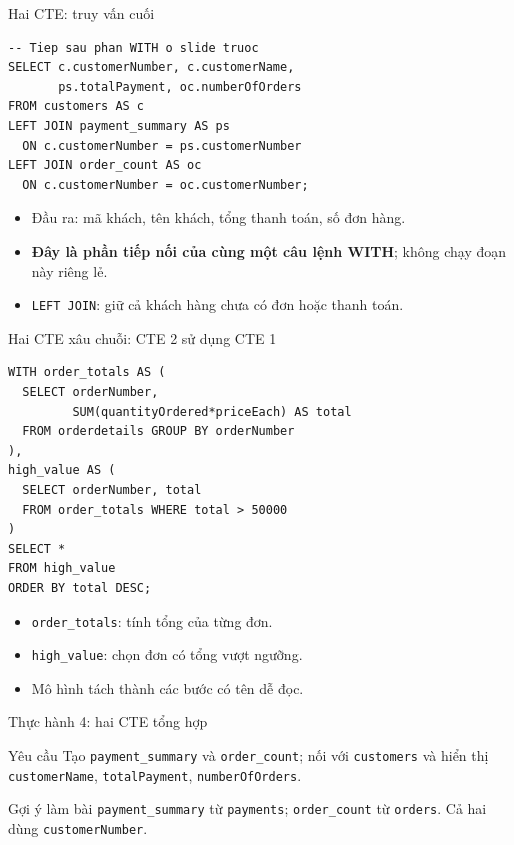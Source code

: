 \documentclass[aspectratio=169,10pt]{beamer}
\newcommand{\code}[1]{\texttt{#1}}
\begin{document}
\begin{frame}[fragile]{Hai CTE: truy vấn cuối}
\small
\begin{lstlisting}[basicstyle=\ttfamily\scriptsize]
-- Tiep sau phan WITH o slide truoc
SELECT c.customerNumber, c.customerName,
       ps.totalPayment, oc.numberOfOrders
FROM customers AS c
LEFT JOIN payment_summary AS ps
  ON c.customerNumber = ps.customerNumber
LEFT JOIN order_count AS oc
  ON c.customerNumber = oc.customerNumber;
\end{lstlisting}
\vspace{.1em}
\begin{itemize}
\item Đầu ra: mã khách, tên khách, tổng thanh toán, số đơn hàng.
\item \textbf{Đây là phần tiếp nối của cùng một câu lệnh WITH}; không chạy đoạn này riêng lẻ.
\item \code{LEFT JOIN}: giữ cả khách hàng chưa có đơn hoặc thanh toán.
\end{itemize}
\end{frame}

\begin{frame}[fragile]{Hai CTE xâu chuỗi: CTE 2 sử dụng CTE 1}
\small
\begin{lstlisting}[basicstyle=\ttfamily\scriptsize]
WITH order_totals AS (
  SELECT orderNumber,
         SUM(quantityOrdered*priceEach) AS total
  FROM orderdetails GROUP BY orderNumber
),
high_value AS (
  SELECT orderNumber, total
  FROM order_totals WHERE total > 50000
)
SELECT *
FROM high_value
ORDER BY total DESC;
\end{lstlisting}
\vspace{.1em}
\begin{itemize}
\item \code{order\_totals}: tính tổng của từng đơn.
\item \code{high\_value}: chọn đơn có tổng vượt ngưỡng.
\item Mô hình tách thành các bước có tên dễ đọc.
\end{itemize}
\end{frame}

\begin{frame}[fragile]{Thực hành 4: hai CTE tổng hợp}
\begin{block}{Yêu cầu}
Tạo \code{payment\_summary} và \code{order\_count}; nối với \code{customers} và hiển thị \code{customerName}, \code{totalPayment}, \code{numberOfOrders}.
\end{block}
\begin{alertblock}{Gợi ý làm bài}
\code{payment\_summary} từ \code{payments}; \code{order\_count} từ \code{orders}. Cả hai dùng \code{customerNumber}.
\end{alertblock}
\end{frame}
\end{document}
